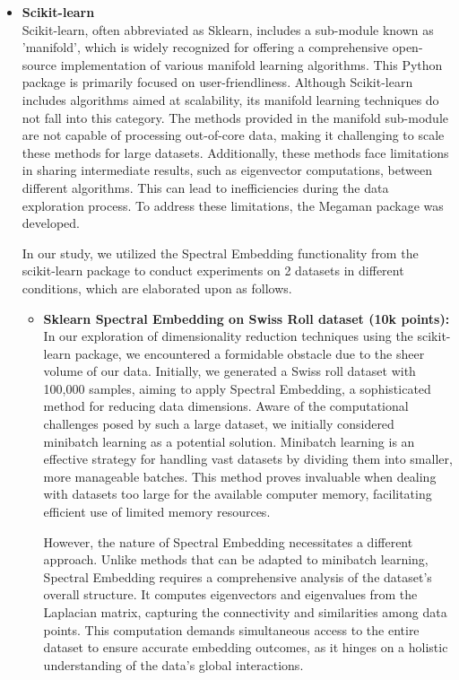 \begin{itemize}
	      	      
	\item \textbf{Scikit-learn}\\
        Scikit-learn, often abbreviated as Sklearn, includes a sub-module known as 'manifold', which is widely recognized for offering a comprehensive open-source implementation of various manifold learning algorithms. This Python package is primarily focused on user-friendliness. Although Scikit-learn includes algorithms aimed at scalability, its manifold learning techniques do not fall into this category. The methods provided in the manifold sub-module are not capable of processing out-of-core data, making it challenging to scale these methods for large datasets. Additionally, these methods face limitations in sharing intermediate results, such as eigenvector computations, between different algorithms. This can lead to inefficiencies during the data exploration process. To address these limitations, the Megaman package was developed.

        In our study, we utilized the Spectral Embedding functionality from the scikit-learn package to conduct experiments on 2 datasets in different conditions, which are elaborated upon as follows.\\
        \begin{itemize}
            \item \textbf{Sklearn Spectral Embedding on Swiss Roll dataset (10k points):} \\ 
            In our exploration of dimensionality reduction techniques using the scikit-learn package, we encountered a formidable obstacle due to the sheer volume of our data. Initially, we generated a Swiss roll dataset with 100,000 samples, aiming to apply Spectral Embedding, a sophisticated method for reducing data dimensions. Aware of the computational challenges posed by such a large dataset, we initially considered minibatch learning as a potential solution. Minibatch learning is an effective strategy for handling vast datasets by dividing them into smaller, more manageable batches. This method proves invaluable when dealing with datasets too large for the available computer memory, facilitating efficient use of limited memory resources.

            However, the nature of Spectral Embedding necessitates a different approach. Unlike methods that can be adapted to minibatch learning, Spectral Embedding requires a comprehensive analysis of the dataset's overall structure. It computes eigenvectors and eigenvalues from the Laplacian matrix, capturing the connectivity and similarities among data points. This computation demands simultaneous access to the entire dataset to ensure accurate embedding outcomes, as it hinges on a holistic understanding of the data's global interactions.


\end{itemize}
\end{itemize}
